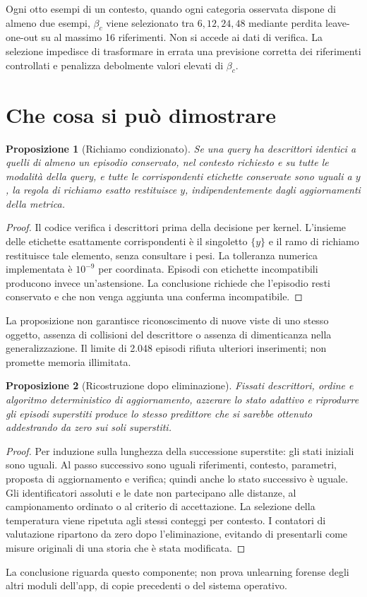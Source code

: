 \documentclass[11pt,a4paper]{article}
\newtheorem{proposizione}{Proposizione}
\begin{document}
Ogni otto esempi di un contesto, quando ogni categoria osservata dispone di
almeno due esempi, $\beta_c$ viene selezionato tra $6,12,24,48$ mediante perdita
leave-one-out su al massimo 16 riferimenti. Non si accede ai dati di verifica.
La selezione impedisce di trasformare in errata una previsione corretta dei
riferimenti controllati e penalizza debolmente valori elevati di $\beta_c$.

\section{Che cosa si può dimostrare}
\begin{proposizione}[Richiamo condizionato]
Se una query ha descrittori identici a quelli di almeno un episodio conservato,
nel contesto richiesto e su tutte le modalità della query, e tutte le
corrispondenti etichette conservate sono uguali a $y$, la regola di richiamo
esatto restituisce $y$, indipendentemente dagli aggiornamenti della metrica.
\end{proposizione}
\begin{proof}
Il codice verifica i descrittori prima della decisione per kernel. L'insieme
delle etichette esattamente corrispondenti è il singoletto $\{y\}$ e il ramo
di richiamo restituisce tale elemento, senza consultare i pesi. La tolleranza
numerica implementata è $10^{-9}$ per coordinata. Episodi con etichette
incompatibili producono invece un'astensione. La conclusione richiede che
l'episodio resti conservato e che non venga aggiunta una conferma incompatibile.
\end{proof}
La proposizione non garantisce riconoscimento di nuove viste di uno stesso
oggetto, assenza di collisioni del descrittore o assenza di dimenticanza
nella generalizzazione. Il limite di 2.048 episodi rifiuta ulteriori inserimenti;
non promette memoria illimitata.

\begin{proposizione}[Ricostruzione dopo eliminazione]
Fissati descrittori, ordine e algoritmo deterministico di aggiornamento,
azzerare lo stato adattivo e riprodurre gli episodi superstiti produce lo stesso
predittore che si sarebbe ottenuto addestrando da zero sui soli superstiti.
\end{proposizione}
\begin{proof}
Per induzione sulla lunghezza della successione superstite: gli stati iniziali
sono uguali. Al passo successivo sono uguali riferimenti, contesto, parametri,
proposta di aggiornamento e verifica; quindi anche lo stato successivo è uguale.
Gli identificatori assoluti e le date non partecipano alle distanze, al
campionamento ordinato o al criterio di accettazione. La selezione della
temperatura viene ripetuta agli stessi conteggi per contesto. I contatori di
valutazione ripartono da zero dopo l'eliminazione, evitando di presentarli come
misure originali di una storia che è stata modificata.
\end{proof}
La conclusione riguarda questo componente; non prova unlearning forense degli
altri moduli dell'app, di copie precedenti o del sistema operativo.
\end{document}
